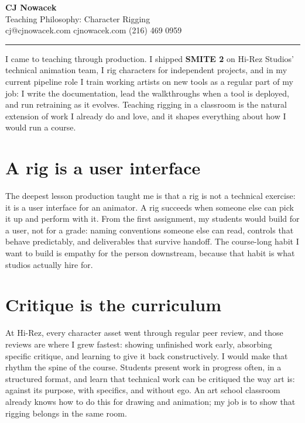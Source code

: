 \documentclass[11pt,a4paper]{article}
\begin{document}
{\huge\bfseries CJ Nowacek}\\[2pt]
{\large\color{accent} Teaching Philosophy: Character Rigging}\\[2pt]
{\small cj@cjnowacek.com \textbullet{} cjnowacek.com \textbullet{} (216) 469 0959}

\vspace{6pt}
\hrule
\vspace{4pt}

I came to teaching through production. I shipped \textbf{SMITE 2} on Hi-Rez Studios' technical animation team, I rig characters for independent projects, and in my current pipeline role I train working artists on new tools as a regular part of my job: I write the documentation, lead the walkthroughs when a tool is deployed, and run retraining as it evolves. Teaching rigging in a classroom is the natural extension of work I already do and love, and it shapes everything about how I would run a course.

\section{A rig is a user interface}
The deepest lesson production taught me is that a rig is not a technical exercise: it is a user interface for an animator. A rig succeeds when someone else can pick it up and perform with it. From the first assignment, my students would build for a user, not for a grade: naming conventions someone else can read, controls that behave predictably, and deliverables that survive handoff. The course-long habit I want to build is empathy for the person downstream, because that habit is what studios actually hire for.

\section{Critique is the curriculum}
At Hi-Rez, every character asset went through regular peer review, and those reviews are where I grew fastest: showing unfinished work early, absorbing specific critique, and learning to give it back constructively. I would make that rhythm the spine of the course. Students present work in progress often, in a structured format, and learn that technical work can be critiqued the way art is: against its purpose, with specifics, and without ego. An art school classroom already knows how to do this for drawing and animation; my job is to show that rigging belongs in the same room.
\end{document}
